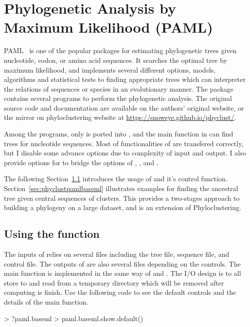 
\section[Phylogenetic Analysis by Maximum Likelihood (PAML)]{Phylogenetic Analysis by Maximum Likelihood (PAML)}
\label{sec:paml}

PAML~\citep{Yang1997,Yang2007} is one of the popular packages for estimating
phylogenetic trees given nucleotide, codon, or amino acid sequences. It searches
the optimal tree by maximum likelihood, and implements several different
options, models, algorithms and statistical tests to finding appropriate
trees which can interpreter the relations of sequences or species in an
evolutionary manner. The package contains several programs to perform
the phylogenetic analysis.
The original source code and documentation are available on the authors'
original website, or the mirror on phyloclustering website at
\url{https://snoweye.github.io/phyclust/}.

Among the programs, only  is ported into
, and the main function  in 
can find trees for nucleotide sequences.
Most of functionalities of  are transfered correctly, but I
disable some advance options due to complexity of input and output.
I also provide options for  to bridge the options of
, , and .

The following Section~\ref{sec:pamlbaseml} introduces the usage of
 and it's control function.
Section~\ref{sec:phyclustpamlbaseml} illustrates examples for finding the
ancestral tree given central sequences of clusters.
This provides a two-stages approach to building a phylogeny on a large dataset,
and is an extension of Phyloclustering.




\subsection[Using the paml.baseml() function]{Using the  function}
\label{sec:pamlbaseml}
 
The inputs of  relies on several files
including the tree file, sequence file, and control file. The outputs of 
are also several files depending on the controls.
The main function  is implemented in the same way of 
and . The I/O design is to all store to and read from a temporary
directory which will be removed after computing is finish.
Use the following code to see the default controls and the details of the
main function.
\begin{Code}
> ?paml.baseml
> paml.baseml.show.default()
\end{Code}


